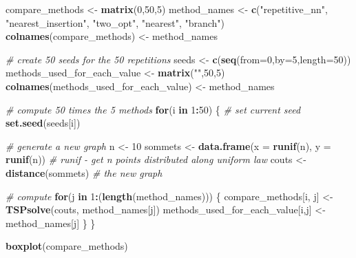 \documentclass[
]{article}
\newenvironment{Shaded}{\begin{snugshade}}{\end{snugshade}}
\newcommand{\CommentTok}[1]{\textcolor[rgb]{0.56,0.35,0.01}{\textit{#1}}}
\newcommand{\ControlFlowTok}[1]{\textcolor[rgb]{0.13,0.29,0.53}{\textbf{#1}}}
\newcommand{\DataTypeTok}[1]{\textcolor[rgb]{0.13,0.29,0.53}{#1}}
\newcommand{\DecValTok}[1]{\textcolor[rgb]{0.00,0.00,0.81}{#1}}
\newcommand{\KeywordTok}[1]{\textcolor[rgb]{0.13,0.29,0.53}{\textbf{#1}}}
\newcommand{\NormalTok}[1]{#1}
\newcommand{\OperatorTok}[1]{\textcolor[rgb]{0.81,0.36,0.00}{\textbf{#1}}}
\newcommand{\StringTok}[1]{\textcolor[rgb]{0.31,0.60,0.02}{#1}}
\begin{document}
\begin{Shaded}
\begin{Highlighting}[]
\NormalTok{compare_methods <-}\StringTok{ }\KeywordTok{matrix}\NormalTok{(}\DecValTok{0}\NormalTok{,}\DecValTok{50}\NormalTok{,}\DecValTok{5}\NormalTok{)}
\NormalTok{method_names <-}\StringTok{ }\KeywordTok{c}\NormalTok{(}\StringTok{"repetitive_nn"}\NormalTok{, }\StringTok{"nearest_insertion"}\NormalTok{, }\StringTok{"two_opt"}\NormalTok{, }\StringTok{"nearest"}\NormalTok{, }\StringTok{"branch"}\NormalTok{)}
\KeywordTok{colnames}\NormalTok{(compare_methods) <-}\StringTok{ }\NormalTok{method_names}

\CommentTok{# create 50 seeds for the 50 repetitions}
\NormalTok{seeds <-}\StringTok{ }\KeywordTok{c}\NormalTok{(}\KeywordTok{seq}\NormalTok{(}\DataTypeTok{from=}\DecValTok{0}\NormalTok{,}\DataTypeTok{by=}\DecValTok{5}\NormalTok{,}\DataTypeTok{length=}\DecValTok{50}\NormalTok{))}
\NormalTok{methods_used_for_each_value <-}\StringTok{ }\KeywordTok{matrix}\NormalTok{(}\StringTok{""}\NormalTok{,}\DecValTok{50}\NormalTok{,}\DecValTok{5}\NormalTok{)}
\KeywordTok{colnames}\NormalTok{(methods_used_for_each_value) <-}\StringTok{ }\NormalTok{method_names}

\CommentTok{# compute 50 times the 5 methods}
\ControlFlowTok{for}\NormalTok{(i }\ControlFlowTok{in} \DecValTok{1}\OperatorTok{:}\DecValTok{50}\NormalTok{) \{}
  \CommentTok{# set current seed}
  \KeywordTok{set.seed}\NormalTok{(seeds[i])}
  
  \CommentTok{# generate a new graph}
\NormalTok{  n <-}\StringTok{ }\DecValTok{10}
\NormalTok{  sommets <-}\StringTok{ }\KeywordTok{data.frame}\NormalTok{(}\DataTypeTok{x =} \KeywordTok{runif}\NormalTok{(n), }\DataTypeTok{y =} \KeywordTok{runif}\NormalTok{(n)) }\CommentTok{# runif - get n points distributed along uniform law}
\NormalTok{  couts <-}\StringTok{ }\KeywordTok{distance}\NormalTok{(sommets) }\CommentTok{# the new graph}
  
  \CommentTok{# compute}
  \ControlFlowTok{for}\NormalTok{(j }\ControlFlowTok{in} \DecValTok{1}\OperatorTok{:}\NormalTok{(}\KeywordTok{length}\NormalTok{(method_names))) \{}
\NormalTok{    compare_methods[i, j] <-}\StringTok{ }\KeywordTok{TSPsolve}\NormalTok{(couts, method_names[j])}
\NormalTok{    methods_used_for_each_value[i,j] <-}\StringTok{ }\NormalTok{method_names[j]}
\NormalTok{  \}}
\NormalTok{\}}

\KeywordTok{boxplot}\NormalTok{(compare_methods)}
\end{Highlighting}
\end{Shaded}
\end{document}
